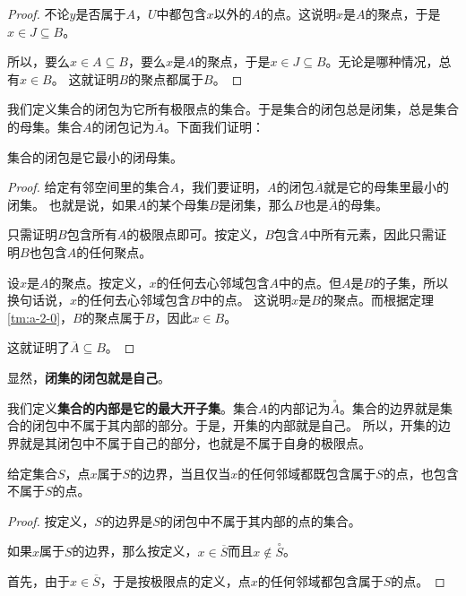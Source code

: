 \documentclass[12pt,UTF8]{ctexbook}
\begin{document}
\begin{appendix}
\begin{proof}
    不论$y$是否属于$A$，$U$中都包含$x$以外的$A$的点。这说明$x$是$A$的聚点，于是$x\in J\subseteq B$。
    
    所以，要么$x\in A\subseteq B$，要么$x$是$A$的聚点，于是$x\in J\subseteq B$。无论是哪种情况，总有$x\in B$。
    这就证明$B$的聚点都属于$B$。

\end{proof}

我们定义集合的闭包为它所有极限点的集合。于是集合的闭包总是闭集，总是集合的母集。集合$A$的闭包记为$\overline{A}$。下面我们证明：

\begin{tm}\label{tm:a-2-20}
    集合的闭包是它最小的闭母集。
\end{tm}

\begin{proof}
    给定有邻空间里的集合$A$，我们要证明，$A$的闭包$\overline{A}$就是它的母集里最小的闭集。
    也就是说，如果$A$的某个母集$B$是闭集，那么$B$也是$\overline{A}$的母集。

    只需证明$B$包含所有$A$的极限点即可。按定义，$B$包含$A$中所有元素，因此只需证明$B$也包含$A$的任何聚点。

    设$x$是$A$的聚点。按定义，$x$的任何去心邻域包含$A$中的点。但$A$是$B$的子集，所以换句话说，$x$的任何去心邻域包含$B$中的点。
    这说明$x$是$B$的聚点。而根据定理\ref{tm:a-2-0}，$B$的聚点属于$B$，因此$x\in B$。
    
    这就证明了$\overline{A}\subseteq B$。

\end{proof}

显然，\textbf{闭集的闭包就是自己}。

我们定义\textbf{集合的内部是它的最大开子集}。集合$A$的内部记为$\overset{\circ}{A}$。集合的边界就是集合的闭包中不属于其内部的部分。于是，开集的内部就是自己。
所以，开集的边界就是其闭包中不属于自己的部分，也就是不属于自身的极限点。

\begin{tm}\label{tm:a-2-30}
    给定集合$S$，点$x$属于$S$的边界，当且仅当$x$的任何邻域都既包含属于$S$的点，也包含不属于$S$的点。
\end{tm}

\begin{proof}
    按定义，$S$的边界是$S$的闭包中不属于其内部的点的集合。

    如果$x$属于$S$的边界，那么按定义，$x\in \overline{S}$而且$x\notin\overset{\circ}{S}$。

    首先，由于$x\in \overline{S}$，于是按极限点的定义，点$x$的任何邻域都包含属于$S$的点。


\end{proof}
\end{appendix}
\end{document}

